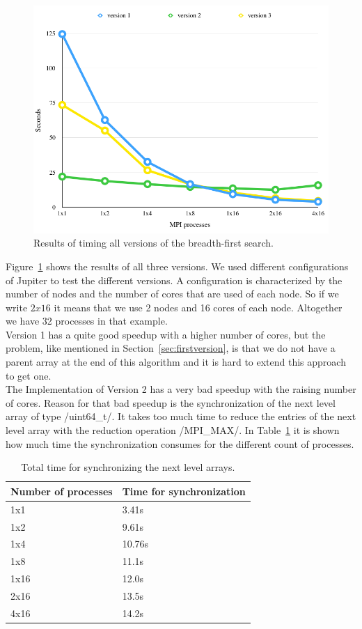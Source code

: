 \documentclass[12pt,a4paper]{article}
\begin{document}
\begin{figure}[!ht]
   \centering
   \includegraphics[width=1.00\textwidth]{allversions}
   \caption{Results of timing all versions of the breadth-first search.}
   \label{fig:allversions}
\end{figure}
Figure~\ref{fig:allversions} shows the results of all three versions. We used different configurations of Jupiter to test the different versions. A configuration is characterized by the number of nodes and the number of cores that are used of each node. So if we write \(2x16\) it means that we use 2 nodes and 16 cores of each node. Altogether we have 32 processes in that example.\\
Version 1 has a quite good speedup with a higher number of cores, but the problem, like mentioned in Section~\ref{sec:firstversion}, is that we do not have a parent array at the end of this algorithm and it is hard to extend this approach to get one.\\
The Implementation of Version 2 has a very bad speedup with the raising number of cores. Reason for that bad speedup is the synchronization of the next level array of type \cinline/uint64_t/. It takes too much time to reduce the entries of the next level array with the reduction operation \cinline/MPI_MAX/. In Table~\ref{tab:reducescatter} it is shown how much time the synchronization consumes for the different count of processes.\\
\begin{table}[!ht]
	\centering
	\begin{tabular}{ | l | l |}
  		\hline
  		Number of processes & Time for synchronization \\ \hline
  		1x1 & 3.41s \\ \hline
		1x2 & 9.61s \\ \hline
		1x4 & 10.76s \\ \hline
		1x8 & 11.1s \\ \hline
		1x16 & 12.0s \\ \hline
		2x16 & 13.5s \\ \hline
		4x16 & 14.2s \\ \hline
	\end{tabular}
	\caption{Total time for synchronizing the next level arrays.}
  	\label{tab:reducescatter}
\end{table}
\end{document}
